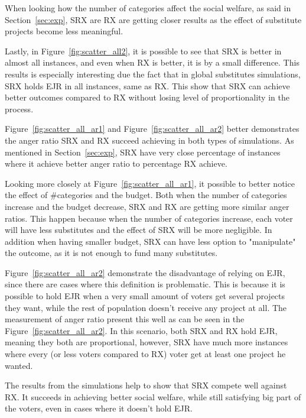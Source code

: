 \documentclass[runningheads]{llncs}
\begin{document}
\begin{subappendices}
When looking how the number of categories affect the social welfare, as said in Section~\ref{sec:exp}, SRX are RX are getting closer results as the effect of substitute projects become less meaningful.

Lastly, in Figure~\ref{fig:scatter_all2}, it is possible to see that SRX is better in almost all instances, and even when RX is better, it is by a small difference. This results is especially interesting due the fact that in global substitutes simulations, SRX holds EJR in all instances, same as RX. This show that SRX can achieve better outcomes compared to RX without losing level of proportionality in the process.

Figure~\ref{fig:scatter_all_ar1} and Figure~\ref{fig:scatter_all_ar2} better demonstrates the anger ratio SRX and RX succeed achieving in both types of simulations. As mentioned in Section~\ref{sec:exp}, SRX have very close percentage of instances where it achieve better anger ratio to percentage RX achieve.

Looking more closely at Figure~\ref{fig:scatter_all_ar1}, it possible to better notice the effect of \#categories and the budget. Both when the number of categories increase and the budget decrease, SRX and RX are getting more similar anger ratios. This happen because when the number of categories increase, each voter will have less substitutes and the effect of SRX will be more negligible. In addition when having smaller budget, SRX can have less option to "manipulate" the outcome, as it is not enough to fund many substitutes.

Figure~\ref{fig:scatter_all_ar2} demonstrate the disadvantage of relying on EJR, since there are cases where this definition is problematic. This is because it is possible to hold EJR when a very small amount of voters get several projects they want, while the rest of population doesn't receive any project at all. The measurement of anger ratio present this well as can be seen in the Figure~\ref{fig:scatter_all_ar2}. In this scenario, both SRX and RX hold EJR, meaning they both are proportional, however, SRX have much more instances where every (or less voters compared to RX) voter get at least one project he wanted.

The results from the simulations help to show that SRX compete well against RX. It succeeds in achieving better social welfare, while still satisfying big part of the voters, even in cases where it doesn't hold EJR.



\end{subappendices}
\end{document}

